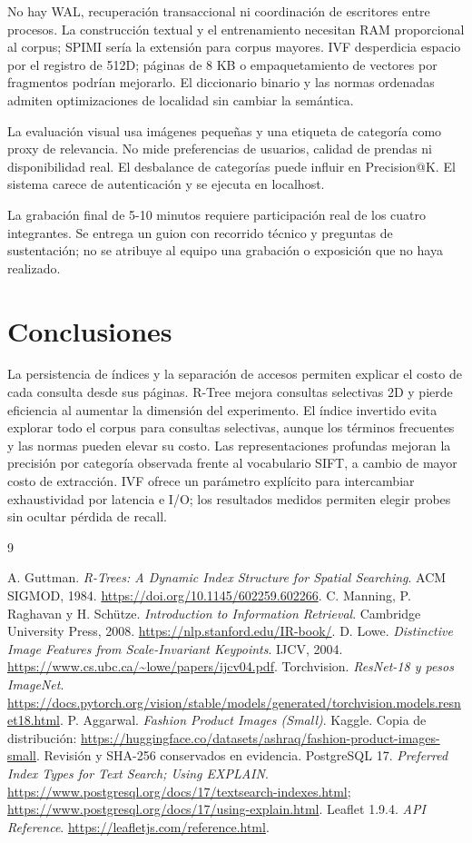 \documentclass[11pt,a4paper]{article}
\begin{document}
No hay WAL, recuperación transaccional ni coordinación de escritores entre procesos. La construcción textual y el entrenamiento necesitan RAM proporcional al corpus; SPIMI sería la extensión para corpus mayores. IVF desperdicia espacio por el registro de 512D; páginas de 8 KB o empaquetamiento de vectores por fragmentos podrían mejorarlo. El diccionario binario y las normas ordenadas admiten optimizaciones de localidad sin cambiar la semántica.

La evaluación visual usa imágenes pequeñas y una etiqueta de categoría como proxy de relevancia. No mide preferencias de usuarios, calidad de prendas ni disponibilidad real. El desbalance de categorías puede influir en Precision@K. El sistema carece de autenticación y se ejecuta en localhost.

La grabación final de 5-10 minutos requiere participación real de los cuatro integrantes. Se entrega un guion con recorrido técnico y preguntas de sustentación; no se atribuye al equipo una grabación o exposición que no haya realizado.

\section{Conclusiones}
La persistencia de índices y la separación de accesos permiten explicar el costo de cada consulta desde sus páginas. R-Tree mejora consultas selectivas 2D y pierde eficiencia al aumentar la dimensión del experimento. El índice invertido evita explorar todo el corpus para consultas selectivas, aunque los términos frecuentes y las normas pueden elevar su costo. Las representaciones profundas mejoran la precisión por categoría observada frente al vocabulario SIFT, a cambio de mayor costo de extracción. IVF ofrece un parámetro explícito para intercambiar exhaustividad por latencia e I/O; los resultados medidos permiten elegir probes sin ocultar pérdida de recall.

\begin{thebibliography}{9}
\raggedright
{} A. Guttman. \emph{R-Trees: A Dynamic Index Structure for Spatial Searching}. ACM SIGMOD, 1984. \url{https://doi.org/10.1145/602259.602266}.
 C. Manning, P. Raghavan y H. Schütze. \emph{Introduction to Information Retrieval}. Cambridge University Press, 2008. \url{https://nlp.stanford.edu/IR-book/}.
 D. Lowe. \emph{Distinctive Image Features from Scale-Invariant Keypoints}. IJCV, 2004. \url{https://www.cs.ubc.ca/~lowe/papers/ijcv04.pdf}.
 Torchvision. \emph{ResNet-18 y pesos ImageNet}. \url{https://docs.pytorch.org/vision/stable/models/generated/torchvision.models.resnet18.html}.
 P. Aggarwal. \emph{Fashion Product Images (Small)}. Kaggle. Copia de distribución: \url{https://huggingface.co/datasets/ashraq/fashion-product-images-small}. Revisión y SHA-256 conservados en evidencia.
 PostgreSQL 17. \emph{Preferred Index Types for Text Search; Using EXPLAIN}. \url{https://www.postgresql.org/docs/17/textsearch-indexes.html}; \url{https://www.postgresql.org/docs/17/using-explain.html}.
 Leaflet 1.9.4. \emph{API Reference}. \url{https://leafletjs.com/reference.html}.
\end{thebibliography}
\end{document}
